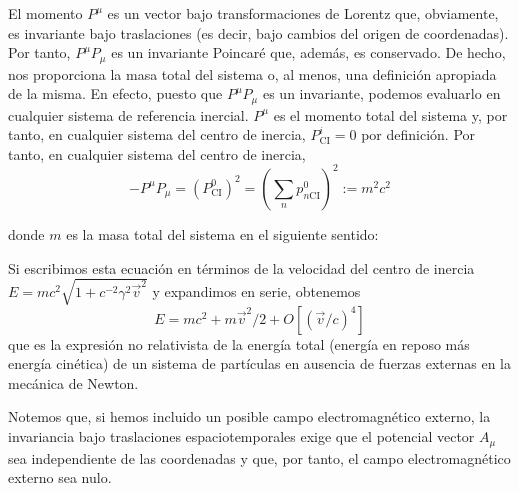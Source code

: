 \begin{example}


  El momento $P^{\mu}$ es un vector bajo transformaciones de Lorentz que, obviamente, es invariante bajo traslaciones (es decir, bajo cambios del origen de coordenadas). Por tanto, $P^{\mu} P_{\mu}$ es un invariante Poincaré que, además, es conservado. De hecho, nos proporciona la masa total del sistema o, al menos, una definición apropiada de la misma. En efecto, puesto que $P^{\mu} P_{\mu}$ es un invariante, podemos evaluarlo en cualquier sistema de referencia inercial. $P^{\mu}$ es el momento total del sistema y, por tanto, en cualquier sistema del centro de inercia, $P_{\mathrm{CI}}^{i}=0$ por definición. Por tanto, en cualquier sistema del centro de inercia,
$$
-P^{\mu} P_{\mu}=\left(P_{\mathrm{CI}}^{0}\right)^{2}=\left(\sum_{n} p_{n \mathrm{CI}}^{0}\right)^{2}:=m^{2} c^{2}
$$


donde $m$ es la masa total del sistema en el siguiente sentido:


Si escribimos esta ecuación en términos de la velocidad del centro de inercia $E=m c^{2} \sqrt{1+c^{-2} \gamma^{2} \vec{v}^{2}}$ y expandimos en serie, obtenemos
$$
E=m c^{2}+m \vec{v}^{2} / 2+O\left[(\vec{v} / c)^{4}\right]
$$
que es la expresión no relativista de la energía total (energía en reposo más energía cinética) de un sistema de partículas en ausencia de fuerzas externas en la mecánica de Newton.

\end{example}
Notemos que, si hemos incluido un posible campo electromagnético externo, la invariancia bajo traslaciones espaciotemporales exige que el potencial vector $A_{\mu}$ sea independiente de las coordenadas y que, por tanto, el campo electromagnético externo sea nulo.
